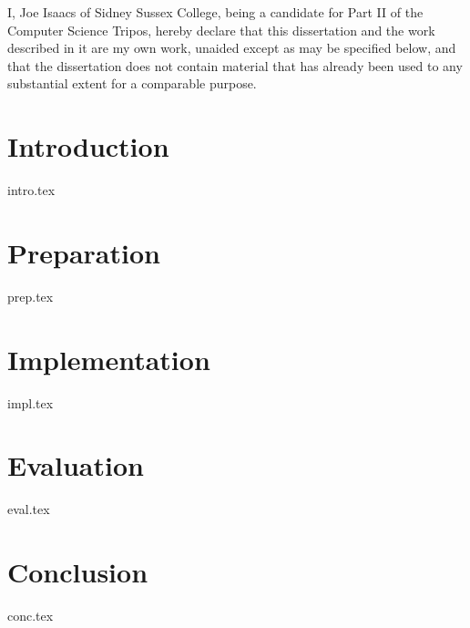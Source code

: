 \documentclass[12pt,a4paper,twoside,openright]{book}
\numberwithin{subcase}{case}
\begin{document}
I, Joe Isaacs of Sidney Sussex College,
being a candidate for Part II of the Computer Science Tripos, hereby declare
that this dissertation and the work described in it are my own work,
unaided except as may be specified below, and that the dissertation
does not contain material that has already been used to any substantial
extent for a comparable purpose.

\bigskip
{}

\medskip
{}

\tableofcontents

\listoffigures
\begingroup
\let\clearpage\relax
\listoftables
\endgroup

\newpage

\mainmatter

\pagestyle{headings}

\chapter{Introduction}

{intro.tex}

\chapter{Preparation}

{prep.tex}

\chapter{Implementation}

{impl.tex}

\chapter{Evaluation}

{eval.tex}

\chapter{Conclusion}

{conc.tex}


\printbibliography

\appendix
\end{document}
